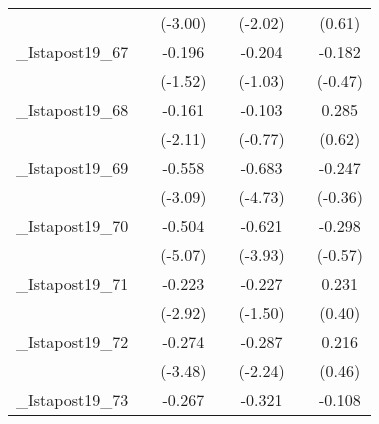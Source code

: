 {\begin{tabular}{l*{6}{c}}
            &                     &     (-3.00)         &                     &     (-2.02)         &                     &      (0.61)         \\
[1em]
\_Istapost19\_67&                     &      -0.196         &                     &      -0.204         &                     &      -0.182         \\
            &                     &     (-1.52)         &                     &     (-1.03)         &                     &     (-0.47)         \\
[1em]
\_Istapost19\_68&                     &      -0.161\sym{*}  &                     &      -0.103         &                     &       0.285         \\
            &                     &     (-2.11)         &                     &     (-0.77)         &                     &      (0.62)         \\
[1em]
\_Istapost19\_69&                     &      -0.558\sym{**} &                     &      -0.683\sym{***}&                     &      -0.247         \\
            &                     &     (-3.09)         &                     &     (-4.73)         &                     &     (-0.36)         \\
[1em]
\_Istapost19\_70&                     &      -0.504\sym{***}&                     &      -0.621\sym{***}&                     &      -0.298         \\
            &                     &     (-5.07)         &                     &     (-3.93)         &                     &     (-0.57)         \\
[1em]
\_Istapost19\_71&                     &      -0.223\sym{**} &                     &      -0.227         &                     &       0.231         \\
            &                     &     (-2.92)         &                     &     (-1.50)         &                     &      (0.40)         \\
[1em]
\_Istapost19\_72&                     &      -0.274\sym{**} &                     &      -0.287\sym{*}  &                     &       0.216         \\
            &                     &     (-3.48)         &                     &     (-2.24)         &                     &      (0.46)         \\
[1em]
\_Istapost19\_73&                     &      -0.267\sym{**} &                     &      -0.321\sym{*}  &                     &      -0.108         \\

\end{tabular}}
